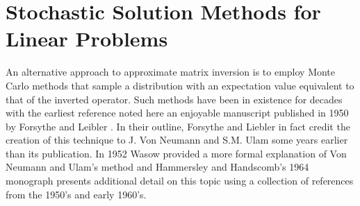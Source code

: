 \chapter{Stochastic Solution Methods for Linear Problems}
\label{chap:stochastic_methods}
An alternative approach to approximate matrix inversion is to employ
Monte Carlo methods that sample a distribution with an expectation
value equivalent to that of the inverted operator. Such methods have
been in existence for decades with the earliest reference noted here
an enjoyable manuscript published in 1950 by Forsythe and Leibler
\citep{forsythe_matrix_1950}. In their outline, Forsythe and Liebler
in fact credit the creation of this technique to J. Von Neumann and
S.M. Ulam some years earlier than its publication. In 1952 Wasow
provided a more formal explanation of Von Neumann and Ulam's method
\citep{wasow_note_1952} and Hammersley and Handscomb's 1964 monograph
\citep{hammersley_monte_1964} presents additional detail on this topic
using a collection of references from the 1950's and early 1960's.

